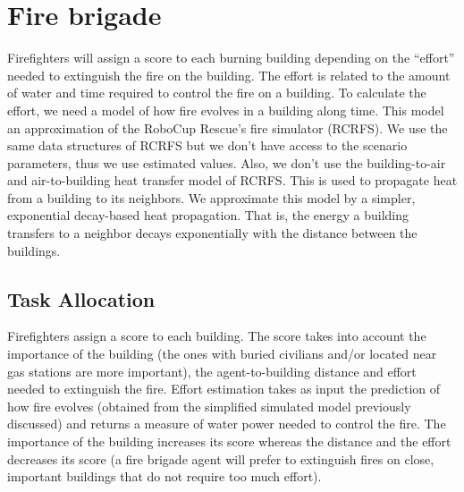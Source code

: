 \section{Fire brigade}
\label{sec:firefighters}

Firefighters will assign a score to each burning building depending on the ``effort'' needed to extinguish the fire on the building. The effort is related to the amount of water and time required to control the fire on a building. To calculate the effort, we need a model of how fire evolves in a building along time. This model an approximation of the RoboCup Rescue's fire simulator (RCRFS). We use the same data structures of RCRFS but we don't have access to the scenario parameters, thus we use estimated values. Also, we don't use the building-to-air and air-to-building heat transfer model of RCRFS. This is used to propagate heat from a building to its neighbors. We approximate this model by a simpler, exponential decay-based heat propagation. That is, the energy a building transfers to a neighbor decays exponentially with the distance between the buildings. %


\subsection{Task Allocation}

Firefighters assign a score to each building. The score takes into account the importance of the building (the ones with buried civilians and/or located near gas stations are more important), the agent-to-building distance and effort needed to extinguish the fire. 
Effort estimation takes as input the prediction of how fire evolves (obtained from the simplified simulated model previously discussed) and returns a measure of water power needed to control the fire. The importance of the building increases its score whereas the distance and the effort decreases its score (a fire brigade agent will prefer to extinguish fires on close, important buildings that do not require too much effort). %

